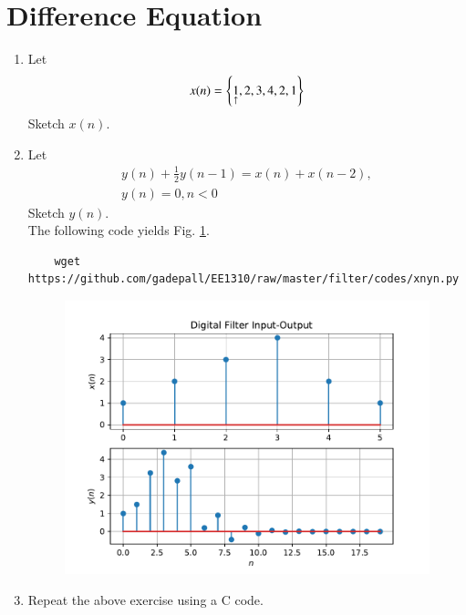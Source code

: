 \documentclass[journal,12pt,twocolumn]{IEEEtran}
\renewcommand\thesection{\arabic{section}}
\begin{document}
\section{Difference Equation}
\begin{enumerate}[label=\thesection.\arabic*,ref=\thesection.\theenumi]
\item Let
\label{def:xn}
\begin{equation}
	x(n) = \left\{\underset{\uparrow}{1},2,3,4,2,1\right\}
\end{equation}
Sketch $x(n)$.
\item Let
\begin{multline}
	\label{eq:iir_filter}
	y(n) + \frac{1}{2}y(n-1) = x(n) + x(n-2), 
	\\
	y(n) = 0, n < 0
\end{multline}
Sketch $y(n)$.  
\\
\solution The following code yields Fig. \ref{fig:xnyn}.
\begin{lstlisting}
	wget https://github.com/gadepall/EE1310/raw/master/filter/codes/xnyn.py
\end{lstlisting}
\begin{figure}[!ht]
	\begin{center}
		\includegraphics[width=\columnwidth]{./figs/xnyn}
	\end{center}
	\label{fig:xnyn}	
\end{figure}
\item Repeat the above exercise using a C code.
%
\end{enumerate}
\end{document}
